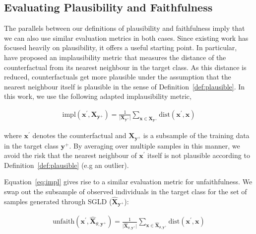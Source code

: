 \subsection{Evaluating Plausibility and Faithfulness}

The parallels between our definitions of plausibility and faithfulness imply that we can also use similar evaluation metrics in both cases. Since existing work has focused heavily on plausibility, it offers a useful starting point. In particular,~\citet{guidotti2022counterfactual} have proposed an implausibility metric that measures the distance of the counterfactual from its nearest neighbour in the target class. As this distance is reduced, counterfactuals get more plausible under the assumption that the nearest neighbour itself is plausible in the sense of Definition~\ref{def:plausible}. In this work, we use the following adapted implausibility metric,

\begin{equation}\label{eq:impl}
  \begin{aligned}
    \text{impl}(\mathbf{x}^{\prime},\mathbf{X}_{\mathbf{y}^+}) = \frac{1}{\lvert\mathbf{X}_{\mathbf{y}^+}\rvert} \sum_{\mathbf{x} \in \mathbf{X}_{\mathbf{y}^+}} \text{dist}(\mathbf{x}^{\prime},\mathbf{x})
  \end{aligned}
\end{equation}

where $\mathbf{x}^{\prime}$ denotes the counterfactual and $\mathbf{X}_{\mathbf{y}^+}$ is a subsample of the training data in the target class $\mathbf{y}^+$. By averaging over multiple samples in this manner, we avoid the risk that the nearest neighbour of $\mathbf{x}^{\prime}$ itself is not plausible according to Definition~\ref{def:plausible} (e.g an outlier).

Equation~\ref{eq:impl} gives rise to a similar evaluation metric for unfaithfulness. We swap out the subsample of observed individuals in the target class for the set of samples generated through SGLD ($\widehat{\mathbf{X}}_{\mathbf{y}^+}$):

\begin{equation}\label{eq:faith}
  \begin{aligned}
    \text{unfaith}(\mathbf{x}^{\prime},\widehat{\mathbf{X}}_{\theta,\mathbf{y}^+}) = \frac{1}{\lvert \widehat{\mathbf{X}}_{\theta,\mathbf{y}^+} \rvert} \sum_{\mathbf{x} \in \widehat{\mathbf{X}}_{\theta,\mathbf{y}^+}} \text{dist}(\mathbf{x}^{\prime},\mathbf{x})
  \end{aligned}
\end{equation}

